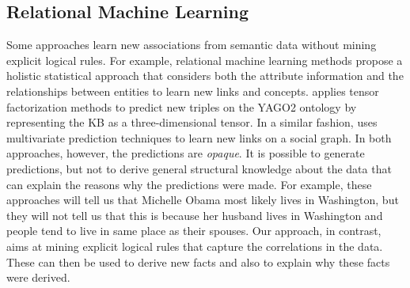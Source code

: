 \subsection{Relational Machine Learning}
Some approaches learn new associations from semantic data without mining explicit logical rules.
For example, relational machine learning methods propose a holistic statistical approach that considers both the attribute information and the relationships between entities to learn new links and concepts. 
\cite{nickel:factorizing} applies tensor factorization
methods to predict new triples on the YAGO2 ontology by representing the KB as a three-dimensional tensor.
In a similar fashion, \cite{Huang:2010:MPL:2022735.2022750} uses multivariate prediction techniques to learn new links on
a social graph. 
In both approaches, however, the predictions are \emph{opaque}. 
It is possible to generate predictions, but not to derive general structural knowledge about the data that can explain the reasons why the predictions were made. 
For example, these approaches will tell us that Michelle Obama most likely lives in Washington, 
but they will not tell us that this is because her husband lives in Washington and people tend to live in same place as their spouses. 
Our approach, in contrast, aims at mining explicit logical rules that capture the correlations in the data.  
These can then be used to derive new facts and also to explain why these facts were derived.
\vspace{-0.5em}
